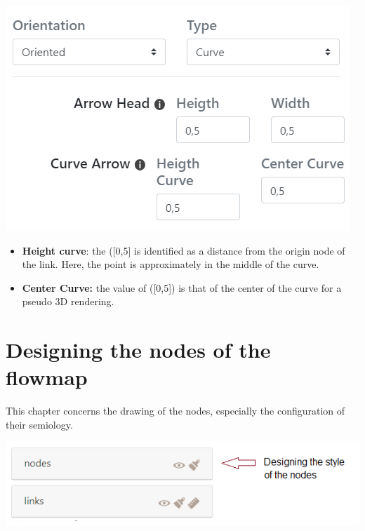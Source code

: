\documentclass[
  letterpaper,
  DIV=11,
  numbers=noendperiod]{scrreprt}
\begin{document}
\begin{center}
\includegraphics{images/Add_links_curve_arrow.png}
\end{center}

\begin{itemize}
\item
  \textbf{Height curve}: the ({[}0,5{]} is identified as a distance from
  the origin node of the link. Here, the point is approximately in the
  middle of the curve.
\item
  \textbf{Center Curve:} the value of ({[}0,5{]}) is that of the center
  of the curve for a pseudo 3D rendering.
\end{itemize}


\chapter{Designing the nodes of the
flowmap}\label{designing-the-nodes-of-the-flowmap}

This chapter concerns the drawing of the nodes, especially the
configuration of their semiology.

\begin{center}
\includegraphics{images/geom_panel_nodessigns.png}
\end{center}
\end{document}

